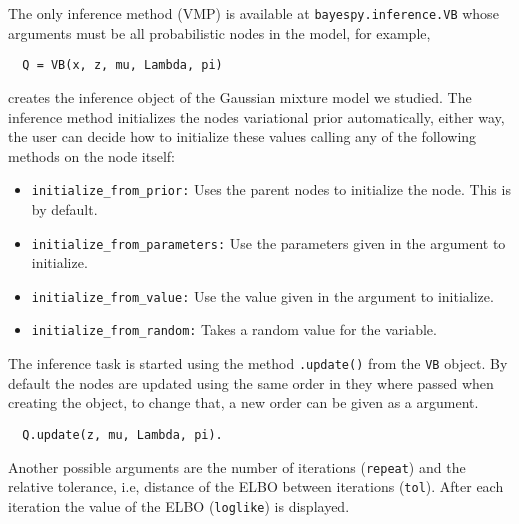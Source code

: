 The only inference method (VMP) is available at \texttt{bayespy.inference.VB} whose arguments must be all probabilistic nodes in the model, for example,
\begin{verbatim}
  Q = VB(x, z, mu, Lambda, pi)
\end{verbatim}
creates the inference object of the Gaussian mixture model we studied. The inference method initializes the nodes variational prior automatically, either way, the user can decide how to initialize these values calling any of the following methods on the node itself:
\begin{itemize}
  \item \texttt{initialize\_from\_prior:} Uses the parent nodes to initialize the node. This is by default.
  \item \texttt{initialize\_from\_parameters:} Use the parameters given in the argument to initialize.
  \item \texttt{initialize\_from\_value:} Use the value given in the argument to initialize.
  \item \texttt{initialize\_from\_random:} Takes a random value for the variable.
\end{itemize}

The inference task is started using the method \texttt{.update()} from the \texttt{VB} object. By default the nodes are updated using the same order in they where passed when creating the object, to change that, a new order can be given as a argument.
\begin{verbatim}
  Q.update(z, mu, Lambda, pi).
\end{verbatim}

Another possible arguments are the number of iterations (\texttt{repeat}) and the relative tolerance, i.e, distance of the ELBO between iterations (\texttt{tol}). After each iteration the value of the ELBO (\texttt{loglike}) is displayed.

